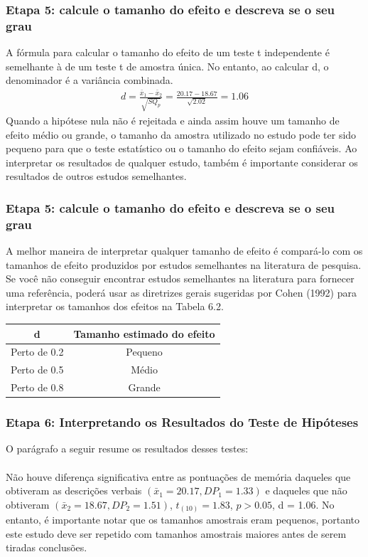 \documentclass[11pt]{beamer}
\begin{document}
\begin{frame}
\frametitle{Etapa 5: calcule o tamanho do efeito e descreva se o seu grau}
A fórmula para calcular o tamanho do efeito de um teste t independente é semelhante à de um teste t de amostra única. No entanto, ao calcular d, o denominador é a variância combinada. 
\begin{align*}
d = \frac{\bar{x}_1 - \bar{x}_2}{\sqrt{SQ_p}} = \frac{20.17-18.67}{\sqrt{2.02}} = 1.06
\end{align*}
Quando a hipótese nula não é rejeitada e ainda assim houve um tamanho de efeito médio ou grande, o tamanho da amostra utilizado no estudo pode ter sido pequeno para que o teste estatístico ou o tamanho do efeito sejam confiáveis. Ao interpretar os resultados de qualquer estudo, também é importante considerar os resultados de outros estudos semelhantes.

\end{frame}

\begin{frame}
\frametitle{Etapa 5: calcule o tamanho do efeito e descreva se o seu grau}
A melhor maneira de interpretar qualquer tamanho de efeito é compará-lo com os tamanhos de efeito produzidos por estudos semelhantes na literatura de pesquisa. Se você não conseguir encontrar estudos semelhantes na literatura para fornecer uma referência, poderá usar as diretrizes gerais sugeridas por Cohen (1992) para interpretar os tamanhos dos efeitos na Tabela 6.2.

\begin{center}
\begin{tabular}{cc} 
 \hline
d  & Tamanho estimado do efeito\\
 \hline
Perto de 0.2 & Pequeno \\
Perto de 0.5 & Médio \\
Perto de 0.8 & Grande \\
 \hline
\end{tabular}
\end{center}   

\end{frame}

\begin{frame}
\frametitle{Etapa 6: Interpretando os Resultados do Teste de Hipóteses}

O parágrafo a seguir resume os resultados desses testes:\\~\\
Não houve diferença significativa entre as pontuações de memória daqueles que obtiveram as descrições verbais $(\bar{x}_1 = 20.17, DP_1 = 1.33)$ e daqueles que não obtiveram $(\bar{x}_2 = 18.67, DP_2 = 1.51)$, $t_{(10)} = 1.83$, $p > 0.05$, d = 1.06. No entanto, é importante notar que os tamanhos amostrais eram pequenos, portanto este estudo deve ser repetido com tamanhos amostrais maiores antes de serem tiradas conclusões.
\end{frame}
\end{document}
